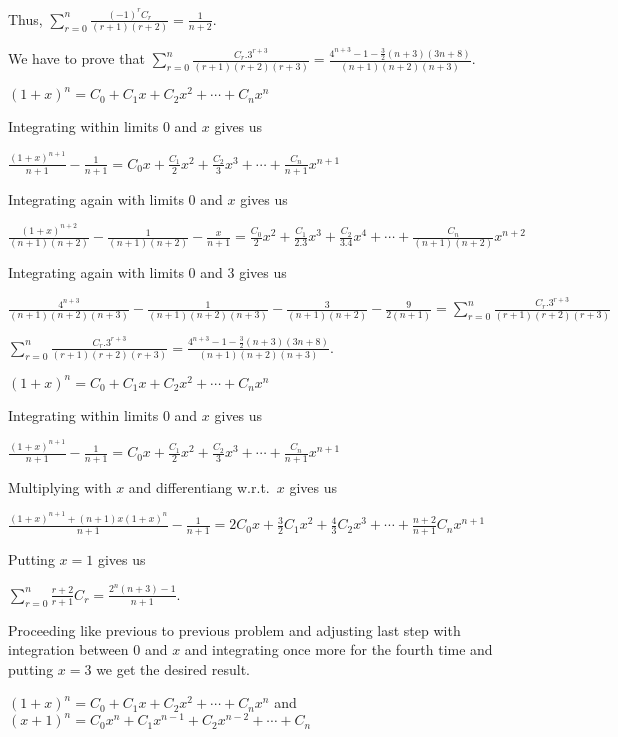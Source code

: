  Thus, $\displaystyle\sum_{r=0}^n\frac{(-1)^rC_r}{(r + 1)(r + 2)} = \frac{1}{n + 2}$.
\item We have to prove that $\displaystyle\sum_{r=0}^n\frac{C_r.3^{r + 3}}{(r + 1)(r + 2)(r + 3)} =
  \frac{4^{n + 3} - 1 - \frac{3}{2}(n + 3)(3n + 8)}{(n + 1)(n + 2)(n + 3)}$.

  $(1 + x)^n = C_0 + C_1x + C_2x^2 + \cdots + C_nx^n$

  Integrating within limits $0$ and $x$ gives us

  $\frac{(1 + x)^{n + 1}}{n + 1} - \frac{1}{n + 1} = C_0x + \frac{C_1}{2}x^2 + \frac{C_2}{3}x^3 + \cdots +
  \frac{C_n}{n + 1}x^{n + 1}$

  Integrating again with limits $0$ and $x$ gives us

  $\frac{(1 + x)^{n + 2}}{(n + 1)(n + 2)} - \frac{1}{(n + 1)(n + 2)} - \frac{x}{n + 1} = \frac{C_0}{2}x^2 +
  \frac{C_1}{2.3}x^3 + \frac{C_2}{3.4}x^4 + \cdots + \frac{C_n}{(n + 1)(n + 2)}x^{n + 2}$

  Integrating again with limits $0$ and $3$ gives us

  $\frac{4^{n + 3}}{(n + 1)(n + 2)(n + 3)} - \frac{1}{(n + 1)(n + 2)(n + 3)} - \frac{3}{(n + 1)(n + 2)} -
  \frac{9}{2(n + 1)} = \displaystyle\sum_{r=0}^n\frac{C_r.3^{r + 3}}{(r + 1)(r + 2)(r + 3)}$

  $\displaystyle\sum_{r=0}^n\frac{C_r.3^{r + 3}}{(r + 1)(r + 2)(r + 3)} = \frac{4^{n + 3} - 1 -
    \frac{3}{2}(n + 3)(3n + 8)}{(n + 1)(n + 2)(n + 3)}$.
\item $(1 + x)^n = C_0 + C_1x + C_2x^2 + \cdots + C_nx^n$

  Integrating within limits $0$ and $x$ gives us

  $\frac{(1 + x)^{n+ 1}}{n + 1} - \frac{1}{n + 1} = C_0x + \frac{C_1}{2}x^2 + \frac{C_2}{3}x^3 + \cdots +
  \frac{C_n}{n + 1}x^{n + 1}$

  Multiplying with $x$ and differentiang w.r.t.\ $x$ gives us

  $\frac{(1 + x)^{n + 1} + (n + 1)x(1 + x)^{n}}{n + 1} - \frac{1}{n + 1} = 2C_0x + \frac{3}{2}C_1x^2 +
  \frac{4}{3}C_2x^3 + \cdots + \frac{n + 2}{n + 1}C_nx^{n + 1}$

  Putting $x = 1$ gives us

  $\displaystyle\sum_{r=0}^n\frac{r + 2}{r + 1}C_r = \frac{2^n(n + 3) - 1}{n + 1}$.
\item Proceeding like previous to previous problem and adjusting last step with integration between $0$ and
  $x$ and integrating once more for the fourth time and putting $x = 3$ we get the desired result.
\item $(1 + x)^n = C_0 + C_1x + C_2x^2 + \cdots + C_nx^n$ and $(x + 1)^n = C_0x^{n} + C_1x^{n - 1} + C_2x^{n
  - 2} + \cdots + C_n$

